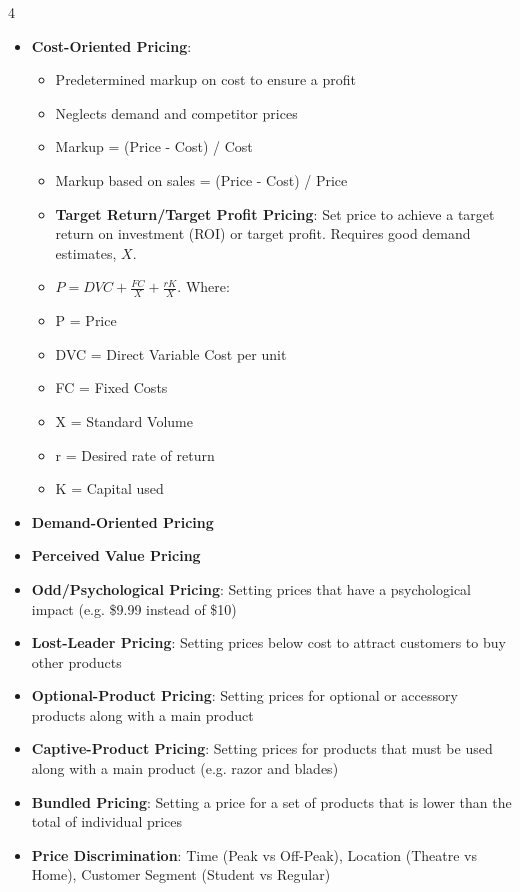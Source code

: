 \documentclass[10pt, landscape]{article}
\begin{document}
\begin{multicols*}{4}
\begin{itemize}
    \item \textbf{Cost-Oriented Pricing}:
      \begin{itemize}
        \item Predetermined markup on cost to ensure a profit
        \item Neglects demand and competitor prices
        \item Markup = (Price - Cost) / Cost
        \item Markup based on sales = (Price - Cost) / Price
        \item \textbf{Target Return/Target Profit Pricing}: Set price to achieve a target return on investment (ROI) or target profit. Requires good demand estimates, $X$.
        \item \( P = DVC + \frac{FC}{X} + \frac{rK}{X} \). Where:
        \item P = Price
        \item DVC = Direct Variable Cost per unit
        \item FC = Fixed Costs
        \item X = Standard Volume
        \item r = Desired rate of return
        \item K = Capital used
      \end{itemize}

    \item \textbf{Demand-Oriented Pricing}
    \item \textbf{Perceived Value Pricing}
    \item \textbf{Odd/Psychological Pricing}: Setting prices that have a psychological impact (e.g. \$9.99 instead of \$10)
    \item \textbf{Lost-Leader Pricing}: Setting prices below cost to attract customers to buy other products
    \item \textbf{Optional-Product Pricing}: Setting prices for optional or accessory products along with a main product
    \item \textbf{Captive-Product Pricing}: Setting prices for products that must be used along with a main product (e.g. razor and blades)
    \item \textbf{Bundled Pricing}: Setting a price for a set of products that is lower than the total of individual prices
    \item \textbf{Price Discrimination}: Time (Peak vs Off-Peak), Location (Theatre vs Home), Customer Segment (Student vs Regular)
  \end{itemize}

\end{multicols*}
\end{document}
